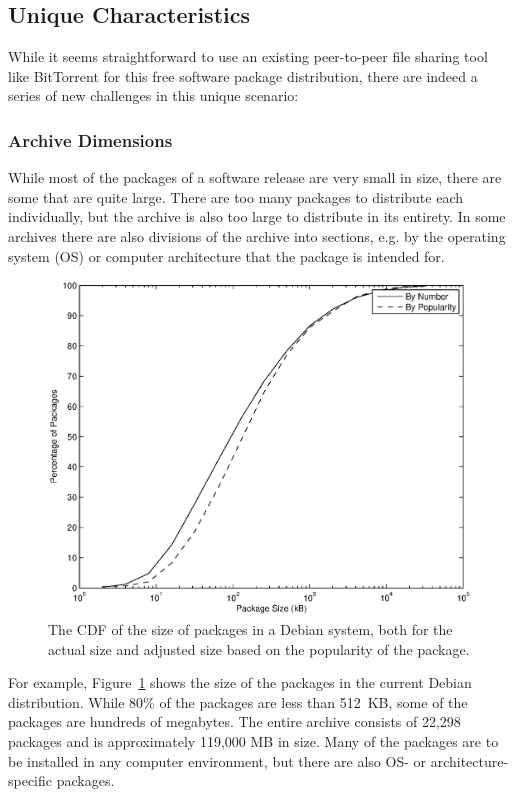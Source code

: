 \documentclass[conference]{IEEEtran}
\begin{document}
\subsection{Unique Characteristics}
\label{problems}

While it seems straightforward to use an existing peer-to-peer file sharing tool like BitTorrent for
this free software package distribution, there are indeed a series of new challenges in this unique scenario:

\subsubsection{Archive Dimensions}

While most of the packages of a software release are very small in
size, there are some that are quite large. There are too many
packages to distribute each individually, but the archive is also
too large to distribute in its entirety. In some archives there are
also divisions of the archive into sections, e.g. by the operating system (OS) or computer
architecture that the package is intended for.

\begin{figure}
\centering
\includegraphics[width=0.80\columnwidth]{apt_p2p_simulation-size_CDF.eps}
\caption{The CDF of the size of packages in a Debian system, both
for the actual size and adjusted size based on the popularity of
the package.}
\label{size_CDF}
\end{figure}

For example, Figure~\ref{size_CDF} shows the size of the packages in the
current Debian distribution. While 80\% of the packages are less than
512~KB, some of the packages are hundreds of megabytes. The entire
archive consists of 22,298 packages and is approximately 119,000 MB
in size. Many of the packages are to be installed in any computer environment, but there are
also OS- or architecture-specific packages.
\end{document}
